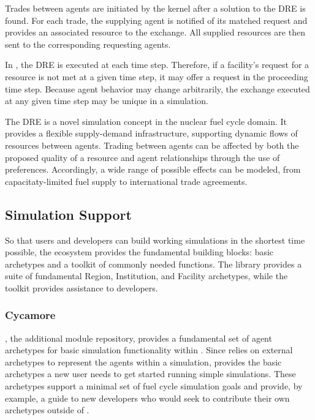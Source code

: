 Trades between agents are initiated by the \Cyclus kernel after a solution to
the \gls{DRE} is found. For each trade, the supplying agent is notified of its
matched request and provides an associated resource to the exchange. All
supplied resources are then sent to the corresponding requesting agents.

In \Cyclus, the \gls{DRE} is executed at each time step. Therefore, if a
facility's request for a resource is not met at a given time step, it may offer
a request in the proceeding time step. Because agent behavior may change
arbitrarily, the exchange executed at any given time step may be unique in a
simulation.

The \gls{DRE} is a novel simulation concept in the nuclear fuel cycle domain. It
provides a flexible supply-demand infrastructure, supporting dynamic flows of
resources between agents. Trading between agents can be affected by both the
proposed quality of a resource and agent relationships through the use of
preferences. Accordingly, a wide range of possible effects can be
modeled, from capacitaty-limited fuel supply to international trade agreements.

\subsection{Simulation Support}
So that users and developers can build working simulations
in the shortest time possible, the \Cyclus ecosystem provides the fundamental
building blocks: basic archetypes and a toolkit of commonly needed functions.
The \Cycamore library provides a suite of fundamental Region, Institution, and
Facility archetypes, while the \Cyclus toolkit provides assistance to
developers.

\subsubsection{Cycamore}

\Cycamore \cite{carlsen_cycamore_2014}, the \Cyclus additional module
repository, provides a fundamental set of agent archetypes for basic simulation
functionality within \Cyclus.  Since \Cyclus relies on external
archetypes to represent the agents within a simulation, \Cycamore provides the
basic archetypes a new user needs to get started running simple simulations.
These archetypes support a minimal set of fuel cycle simulation goals and
provide, by example, a guide to new developers who would seek to contribute
their own archetypes outside of \Cycamore.

